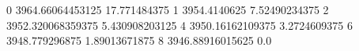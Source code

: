 0 3964.66064453125 17.771484375
1 3954.4140625 7.52490234375
2 3952.320068359375 5.430908203125
4 3950.16162109375 3.2724609375
6 3948.779296875 1.89013671875
8 3946.88916015625 0.0
